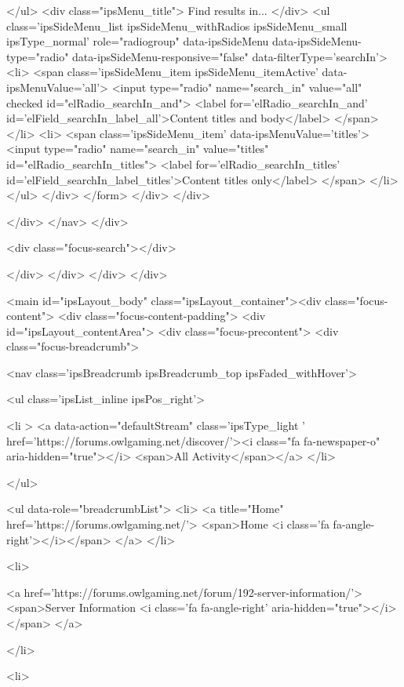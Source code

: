					</ul>
					<div class="ipsMenu_title">
						Find results in...
					</div>
					<ul class='ipsSideMenu_list ipsSideMenu_withRadios ipsSideMenu_small ipsType_normal' role="radiogroup" data-ipsSideMenu data-ipsSideMenu-type="radio" data-ipsSideMenu-responsive="false" data-filterType='searchIn'>
						<li>
							<span class='ipsSideMenu_item ipsSideMenu_itemActive' data-ipsMenuValue='all'>
								<input type="radio" name="search_in" value="all" checked id="elRadio_searchIn_and">
								<label for='elRadio_searchIn_and' id='elField_searchIn_label_all'>Content titles and body</label>
							</span>
						</li>
						<li>
							<span class='ipsSideMenu_item' data-ipsMenuValue='titles'>
								<input type="radio" name="search_in" value="titles" id="elRadio_searchIn_titles">
								<label for='elRadio_searchIn_titles' id='elField_searchIn_label_titles'>Content titles only</label>
							</span>
						</li>
					</ul>
				</div>
			</form>
		</div>
	</div>

		</div>
	</nav>
</div>
								
									<div class="focus-search"></div>
								
							</div>
						</div>
					</div>
				</div>
		
		<main id="ipsLayout_body" class="ipsLayout_container"><div class="focus-content">
				<div class="focus-content-padding">
					<div id="ipsLayout_contentArea">
						<div class="focus-precontent">
							<div class="focus-breadcrumb">
								
<nav class='ipsBreadcrumb ipsBreadcrumb_top ipsFaded_withHover'>
	

	<ul class='ipsList_inline ipsPos_right'>
		
		<li >
			<a data-action="defaultStream" class='ipsType_light '  href='https://forums.owlgaming.net/discover/'><i class="fa fa-newspaper-o" aria-hidden="true"></i> <span>All Activity</span></a>
		</li>
		
	</ul>

	<ul data-role="breadcrumbList">
		<li>
			<a title="Home" href='https://forums.owlgaming.net/'>
				<span>Home <i class='fa fa-angle-right'></i></span>
			</a>
		</li>
		
		
			<li>
				
					<a href='https://forums.owlgaming.net/forum/192-server-information/'>
						<span>Server Information <i class='fa fa-angle-right' aria-hidden="true"></i></span>
					</a>
				
			</li>
		
			<li>
				
